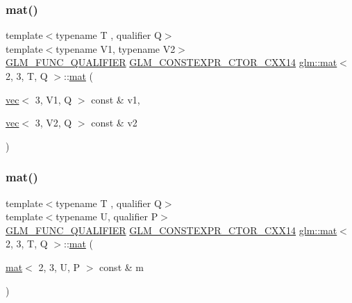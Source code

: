 \subsubsection{\texorpdfstring{mat()}{mat()}\hspace{0.1cm}{\footnotesize\ttfamily [20/21]}}
{\footnotesize\ttfamily template$<$typename T , qualifier Q$>$ \\
template$<$typename V1, typename V2$>$ \\
\mbox{\hyperlink{setup_8hpp_a33fdea6f91c5f834105f7415e2a64407}{G\+L\+M\+\_\+\+F\+U\+N\+C\+\_\+\+Q\+U\+A\+L\+I\+F\+I\+ER}} \mbox{\hyperlink{setup_8hpp_a0900f9145e68bf6061b6f5e7be3fa751}{G\+L\+M\+\_\+\+C\+O\+N\+S\+T\+E\+X\+P\+R\+\_\+\+C\+T\+O\+R\+\_\+\+C\+X\+X14}} \mbox{\hyperlink{structglm_1_1mat}{glm\+::mat}}$<$ 2, 3, T, Q $>$\+::\mbox{\hyperlink{structglm_1_1mat}{mat}} (\begin{DoxyParamCaption}\item[{\mbox{\hyperlink{structglm_1_1vec}{vec}}$<$ 3, V1, Q $>$ const \&}]{v1,  }\item[{\mbox{\hyperlink{structglm_1_1vec}{vec}}$<$ 3, V2, Q $>$ const \&}]{v2 }\end{DoxyParamCaption})}

\mbox{\label{structglm_1_1mat_3_012_00_013_00_01_t_00_01_q_01_4_a6cbdbc4b3a71c347e4d695c9db686054}} 
\subsubsection{\texorpdfstring{mat()}{mat()}\hspace{0.1cm}{\footnotesize\ttfamily [21/21]}}
{\footnotesize\ttfamily template$<$typename T , qualifier Q$>$ \\
template$<$typename U, qualifier P$>$ \\
\mbox{\hyperlink{setup_8hpp_a33fdea6f91c5f834105f7415e2a64407}{G\+L\+M\+\_\+\+F\+U\+N\+C\+\_\+\+Q\+U\+A\+L\+I\+F\+I\+ER}} \mbox{\hyperlink{setup_8hpp_a0900f9145e68bf6061b6f5e7be3fa751}{G\+L\+M\+\_\+\+C\+O\+N\+S\+T\+E\+X\+P\+R\+\_\+\+C\+T\+O\+R\+\_\+\+C\+X\+X14}} \mbox{\hyperlink{structglm_1_1mat}{glm\+::mat}}$<$ 2, 3, T, Q $>$\+::\mbox{\hyperlink{structglm_1_1mat}{mat}} (\begin{DoxyParamCaption}\item[{\mbox{\hyperlink{structglm_1_1mat}{mat}}$<$ 2, 3, U, P $>$ const \&}]{m }\end{DoxyParamCaption})}



